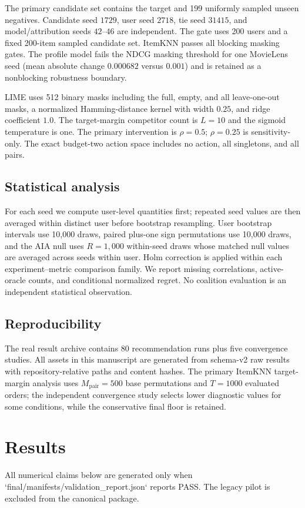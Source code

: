 \documentclass[pdflatex,sn-basic,Numbered]{sn-jnl}
\theoremstyle{thmstyleone}
\theoremstyle{thmstyletwo}
\theoremstyle{thmstylethree}
\begin{document}
The primary candidate set contains the target and 199 uniformly sampled unseen negatives. Candidate seed $1729$, user seed $2718$, tie seed $31415$, and model/attribution seeds $42$--$46$ are independent. The gate uses 200 users and a fixed 200-item sampled candidate set. ItemKNN passes all blocking masking gates. The profile model fails the NDCG masking threshold for one MovieLens seed (mean absolute change $0.000682$ versus $0.001$) and is retained as a nonblocking robustness boundary.

LIME uses 512 binary masks including the full, empty, and all leave-one-out masks, a normalized Hamming-distance kernel with width $0.25$, and ridge coefficient $1.0$. The target-margin competitor count is $L=10$ and the sigmoid temperature is one. The primary intervention is $\rho=0.5$; $\rho=0.25$ is sensitivity-only. The exact budget-two action space includes no action, all singletons, and all pairs.

\subsection{Statistical analysis}
For each seed we compute user-level quantities first; repeated seed values are then averaged within distinct user before bootstrap resampling. User bootstrap intervals use 10,000 draws, paired plus-one sign permutations use 10,000 draws, and the AIA null uses $R=1,000$ within-seed draws whose matched null values are averaged across seeds within user. Holm correction is applied within each experiment--metric comparison family. We report missing correlations, active-oracle counts, and conditional normalized regret. No coalition evaluation is an independent statistical observation.

\subsection{Reproducibility}
The real result archive contains 80 recommendation runs plus five convergence studies. All assets in this manuscript are generated from schema-v2 raw results with repository-relative paths and content hashes. The primary ItemKNN target-margin analysis uses $M_{\mathrm{pair}}=500$ base permutations and $T=1000$ evaluated orders; the independent convergence study selects lower diagnostic values for some conditions, while the conservative final floor is retained.

\section{Results}
All numerical claims below are generated only when `final/manifests/validation_report.json` reports PASS. The legacy pilot is excluded from the canonical package.
\end{document}
